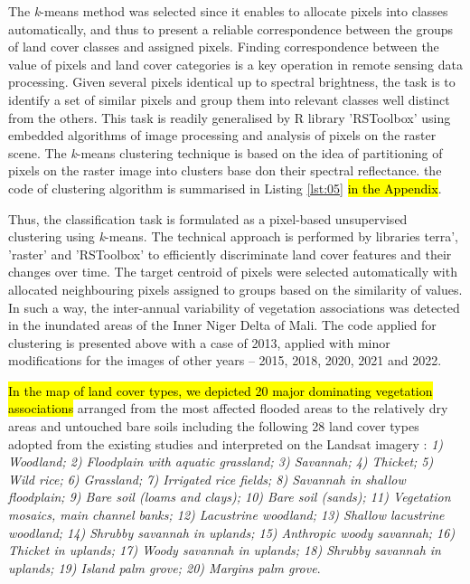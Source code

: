 \documentclass[12pt,a4paper,oneside]{article}
\def \newpar{\vspace{6pt}}
\begin{document}
\newpar The \emph{k}-means method was selected since it enables to allocate pixels into classes automatically, and thus to present a reliable correspondence between the groups of land cover classes and assigned pixels. Finding correspondence between the value of pixels and land cover categories is a key operation in remote sensing data processing. Given several pixels identical up to spectral brightness, the task is to identify a set of similar pixels and group them into relevant classes well distinct from the others. This task is readily generalised by R library 'RSToolbox' using embedded algorithms of image processing and analysis of pixels on the raster scene. The \emph{k}-means clustering technique is based on the idea of partitioning of pixels on the raster image into clusters base don their spectral reflectance. the code of clustering algorithm is summarised in Listing \ref{lst:05} \hl{in the Appendix}.

\newpar Thus, the classification task is formulated as a pixel-based unsupervised clustering using \emph{k}-means. The technical approach is performed by libraries terra', 'raster' and 'RSToolbox' to efficiently discriminate land cover features and their changes over time. The target centroid of pixels were selected automatically with allocated neighbouring pixels assigned to groups based on the similarity of values. In such a way, the inter-annual variability of vegetation associations was detected in the inundated areas of the Inner Niger Delta of Mali. The code applied for clustering is presented above with a case of 2013, applied with minor modifications for the images of other years -- 2015, 2018, 2020, 2021 and 2022.

\newpar \hl{In the map of land cover types, we depicted 20 major dominating vegetation associations} arranged from the most affected flooded areas to the relatively dry areas and untouched bare soils including the following 28 land cover types adopted from the existing studies and interpreted on the Landsat imagery \cite{Marie}: \emph{1) Woodland; 2) Floodplain with aquatic grassland; 3) Savannah; 4) Thicket; 5) Wild rice; 6) Grassland; 7) Irrigated rice fields; 8) Savannah in shallow floodplain; 9) Bare soil (loams and clays); 10) Bare soil (sands); 11) Vegetation mosaics, main channel banks; 12) Lacustrine woodland; 13) Shallow lacustrine woodland; 14) Shrubby savannah in uplands; 15) Anthropic woody savannah; 16) Thicket in uplands; 17) Woody savannah in uplands; 18) Shrubby savannah in uplands; 19) Island palm grove; 20) Margins palm grove}.
\end{document}
